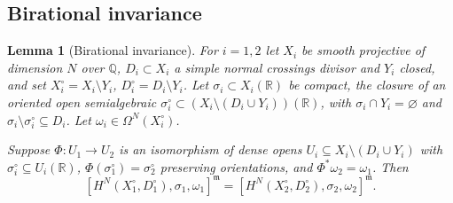 \documentclass[11pt]{article}
\theoremstyle{plain}
\newtheorem{lemma}[prop]{Lemma}
\theoremstyle{definition}
\theoremstyle{remark}
\newcommand{\Q}{\mathbb Q}
\newcommand{\R}{\mathbb R}
\newcommand{\m}{\mathfrak m}
\begin{document}
\subsection{Birational invariance}

\begin{lemma}[Birational invariance]\label{lem:birational}
For $i=1,2$ let $X_i$ be smooth projective of dimension $N$ over $\Q$, $D_i\subset X_i$ a simple normal crossings divisor and $Y_i$ closed, and set $X_i^\circ=X_i\setminus Y_i$, $D_i^\circ=D_i\setminus Y_i$. Let $\sigma_i\subset X_i(\R)$ be compact, the closure of an oriented open semialgebraic $\sigma_i^\circ\subset(X_i\setminus(D_i\cup Y_i))(\R)$, with $\sigma_i\cap Y_i=\varnothing$ and $\sigma_i\setminus\sigma_i^\circ\subseteq D_i$. Let $\omega_i\in\Omega^N(X_i^\circ)$.

Suppose $\Phi:U_1\to U_2$ is an isomorphism of dense opens $U_i\subseteq X_i\setminus(D_i\cup Y_i)$ with $\sigma_i^\circ\subseteq U_i(\R)$, $\Phi(\sigma_1^\circ)=\sigma_2^\circ$ preserving orientations, and $\Phi^\ast\omega_2=\omega_1$. Then
\[
[H^N(X_1^\circ,D_1^\circ),\sigma_1,\omega_1]^{\m}=[H^N(X_2^\circ,D_2^\circ),\sigma_2,\omega_2]^{\m}.
\]
\end{lemma}
\end{document}
